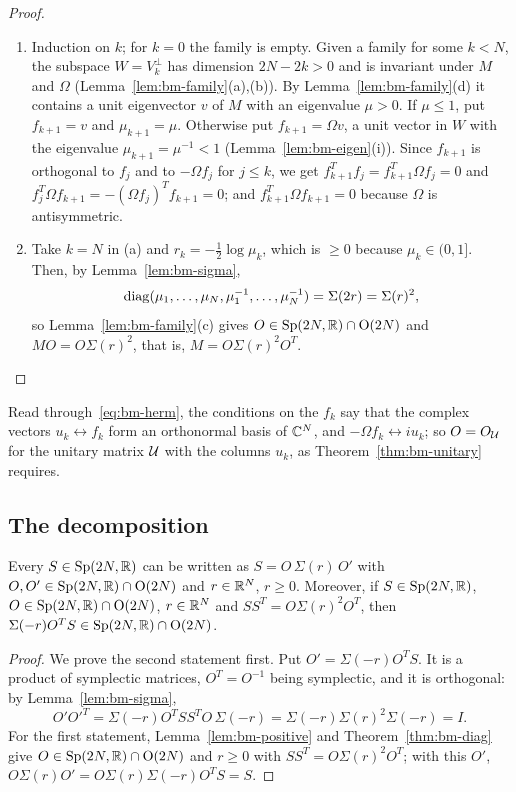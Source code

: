 \begin{vetdenv}
\begin{proof}
\begin{enumerate}
\item[(a)] Induction on $k$; for $k=0$ the family is empty. Given a family for some $k<N$, the subspace
$W=V_k^\perp$ has dimension $2N-2k>0$ and is invariant under $M$ and $\Omega$ (Lemma~\ref{lem:bm-family}(a),(b)).
By Lemma~\ref{lem:bm-family}(d) it contains a unit eigenvector $v$ of $M$ with an eigenvalue $\mu>0$. If $\mu\le1$, put $f_{k+1}=v$ and $\mu_{k+1}=\mu$. Otherwise put
$f_{k+1}=\Omega v$, a unit vector in $W$ with the eigenvalue $\mu_{k+1}=\mu^{-1}<1$ (Lemma~\ref{lem:bm-eigen}(i)).
Since $f_{k+1}$ is orthogonal to $f_j$ and to $-\Omega f_j$ for $j\le k$, we get $f_{k+1}^Tf_j=f_{k+1}^T\Omega f_j=0$ and
$f_j^T\Omega f_{k+1}=-(\Omega f_j)^Tf_{k+1}=0$; and $f_{k+1}^T\Omega f_{k+1}=0$ because $\Omega$ is antisymmetric.
\item[(b)] Take $k=N$ in (a) and $r_k=-\tfrac12\log\mu_k$, which is $\ge0$ because $\mu_k\in(0,1]$. Then, by
Lemma~\ref{lem:bm-sigma},
\[
 \operatorname{diag}(\mu_1,\ldots,\mu_N,\mu_1^{-1},\ldots,\mu_N^{-1})=\Sigma(2r)=\Sigma(r)^2,
\]
so Lemma~\ref{lem:bm-family}(c) gives $O\in\mathrm{Sp}(2N,\mathbb R)\cap\mathrm{O}(2N)$ and $MO=O\Sigma(r)^2$, that is, $M=O\Sigma(r)^2O^T$.\qedhere
\end{enumerate}
\end{proof}

Read through~\eqref{eq:bm-herm}, the conditions on the $f_k$ say that the complex vectors $u_k\leftrightarrow f_k$
form an orthonormal basis of $\mathbb C^N$, and $-\Omega f_k\leftrightarrow iu_k$; so $O=O_\mathcal U$ for the unitary matrix $\mathcal U$
with the columns $u_k$, as Theorem~\ref{thm:bm-unitary} requires.

\subsection{The decomposition}

\begin{theorem}\label{thm:bm-decomp}
Every $S\in\mathrm{Sp}(2N,\mathbb R)$ can be written as $S=O\,\Sigma(r)\,O'$ with $O,O'\in\mathrm{Sp}(2N,\mathbb R)\cap\mathrm{O}(2N)$ and $r\in\mathbb R^N$, $r\ge0$. Moreover, if
$S\in\mathrm{Sp}(2N,\mathbb R)$, $O\in\mathrm{Sp}(2N,\mathbb R)\cap\mathrm{O}(2N)$, $r\in\mathbb R^N$ and $SS^T=O\Sigma(r)^2O^T$, then $\Sigma(-r)O^TS\in\mathrm{Sp}(2N,\mathbb R)\cap\mathrm{O}(2N)$.
\end{theorem}

\begin{proof}
We prove the second statement first. Put $O'=\Sigma(-r)O^TS$. It is a product of symplectic matrices, $O^T=O^{-1}$
being symplectic, and it is orthogonal: by Lemma~\ref{lem:bm-sigma},
\[
 O'O'^T=\Sigma(-r)O^TSS^TO\,\Sigma(-r)=\Sigma(-r)\Sigma(r)^2\Sigma(-r)=I .
\]
For the first statement, Lemma~\ref{lem:bm-positive} and Theorem~\ref{thm:bm-diag} give $O\in\mathrm{Sp}(2N,\mathbb R)\cap\mathrm{O}(2N)$ and $r\ge0$ with
$SS^T=O\Sigma(r)^2O^T$; with this $O'$, $O\Sigma(r)O'=O\Sigma(r)\Sigma(-r)O^TS=S$.
\end{proof}


\end{vetdenv}
